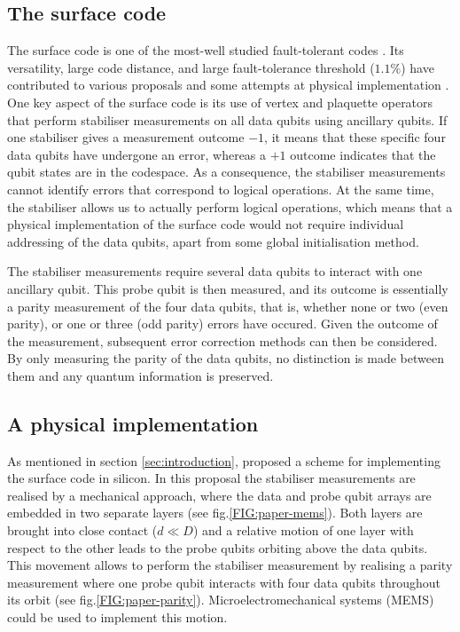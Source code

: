 \subsection{The surface code}
The surface code is one of the most-well studied fault-tolerant codes \cite{Wang2011,Fowler2012}. Its versatility, large code distance, and large fault-tolerance threshold ($1.1\%$) have contributed to various proposals \cite{Fowler2012,Pica2014,Tosi2015,Hill2015,OGorman2016} and some attempts at physical implementation \cite{Barends2014,Kelly2015}. One key aspect of the surface code is its use of vertex and plaquette operators that perform stabiliser measurements on all data qubits using ancillary qubits. If one stabiliser gives a measurement outcome $-1$, it means that these specific four data qubits have undergone an error, whereas a $+1$ outcome indicates that the qubit states are in the codespace. As a consequence, the stabiliser measurements cannot identify errors that correspond to logical operations. At the same time, the stabiliser allows us to actually perform logical operations, which means that a physical implementation of the surface code would not require individual addressing of the data qubits, apart from some global initialisation method. 

The stabiliser measurements require several data qubits to interact with one ancillary qubit. This probe qubit is then measured, and its outcome is essentially a parity measurement of the four data qubits, that is, whether none or two  (even parity), or one or three (odd parity) errors have occured. Given the outcome of the measurement, subsequent error correction methods can then be considered. By only measuring the parity of the data qubits, no distinction is made between them and any quantum information is preserved. 






\subsection{A physical implementation} \label{sec:PhysicalImplementation}
As mentioned in section \ref{sec:introduction},  \citet{OGorman2016} proposed a scheme for implementing the surface code in silicon. In this proposal the stabiliser measurements are realised by a mechanical approach, where the data and probe qubit arrays are embedded in two separate layers (see fig.\@ \ref{FIG:paper-mems}). Both layers are brought into close contact ($d\ll D$) and a relative motion of one layer with respect to the other leads to the probe qubits orbiting above the data qubits. This movement allows to perform the stabiliser measurement by realising a parity measurement where one probe qubit interacts with four data qubits throughout its orbit (see fig.\@ \ref{FIG:paper-parity}). Microelectromechanical systems (MEMS) could be used to implement this motion.


